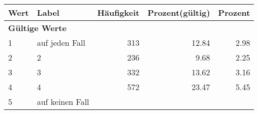      \begin{longtable}{lXrrr}
     \toprule
     \textbf{Wert} & \textbf{Label} & \textbf{Häufigkeit} & \textbf{Prozent(gültig)} & \textbf{Prozent} \\
     \endhead
     \midrule
     \multicolumn{5}{l}{\textbf{Gültige Werte}}\\

     1 &
     \multicolumn{1}{X}{ auf jeden Fall   } &


       \num{313} &
       \num[round-mode=places,round-precision=2]{12,84} &
         \num[round-mode=places,round-precision=2]{2,98} \\

     2 &
     \multicolumn{1}{X}{ 2   } &


       \num{236} &
       \num[round-mode=places,round-precision=2]{9,68} &
         \num[round-mode=places,round-precision=2]{2,25} \\

     3 &
     \multicolumn{1}{X}{ 3   } &


       \num{332} &
       \num[round-mode=places,round-precision=2]{13,62} &
         \num[round-mode=places,round-precision=2]{3,16} \\

     4 &
     \multicolumn{1}{X}{ 4   } &


       \num{572} &
       \num[round-mode=places,round-precision=2]{23,47} &
         \num[round-mode=places,round-precision=2]{5,45} \\

     5 &
     \multicolumn{1}{X}{ auf keinen Fall   } &



\end{longtable}
